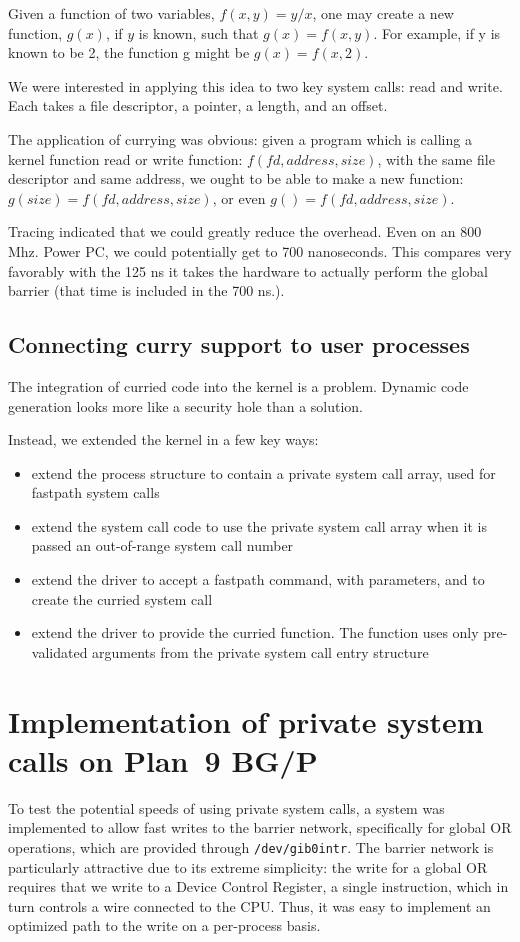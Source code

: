 \documentclass[letterpaper,twocolumn,10pt]{article}
\begin{document}
Given a function of two variables, $ f\left( x, y\right) = y/x$, 
one may create a new function, $g\left( x\right)$, 
if $y$ is known,  such that $g\left( x\right) = f\left( x, y\right)$. 
For example, if y is known to be 2, the function g might be $g\left( x\right) = f\left( x, 2\right)$. 

We were interested in applying this idea to two key system calls: read and write. Each takes a 
file descriptor, a pointer, a length, and an offset. 

The application of currying was obvious: given a program which is calling a kernel function read or write function: $ f\left( fd, address, size\right) $, with 
the same file descriptor and same address, we ought to be able to make a new function: 
$g\left( size\right) = f\left( fd, address, size\right)$, or even 
$g\left( \right) = f\left( fd, address, size\right)$. 

Tracing indicated that we could greatly reduce the overhead. Even on an 800 Mhz. Power PC, we could 
potentially get to 700 nanoseconds. This compares very favorably with the 125 ns it takes the hardware to actually
perform the global barrier (that time is included in the 700 ns.).

\subsection{Connecting curry support to user processes}
The integration of curried code into the kernel is a problem. 
Dynamic code generation looks more like a security
hole than a solution. 

Instead, we extended the kernel in a few key ways: 
\begin{itemize}
\item extend the process structure to contain a private system call array, used for fastpath system calls
\item extend the system call code to use the private system call array when it is passed an out-of-range system 
call number
\item extend the driver to accept a fastpath command, with parameters, and to create the curried system call
\item extend the driver to provide the curried function. The function uses only pre-validated arguments from the private system call entry structure
\end{itemize}

\section{Implementation of private system calls on Plan~9 BG/P}
To test the potential speeds of using private system calls, a system was implemented to allow fast writes to the barrier network, specifically for global OR operations, which are provided through {\tt /dev/gib0intr}. The barrier network is particularly attractive due to its extreme simplicity: the write for a global OR requires that we write to a 
Device Control Register, a single instruction, which in turn controls a
wire connected to the CPU. Thus, it was easy to implement an optimized path to the write on a per-process basis.
\end{document}
